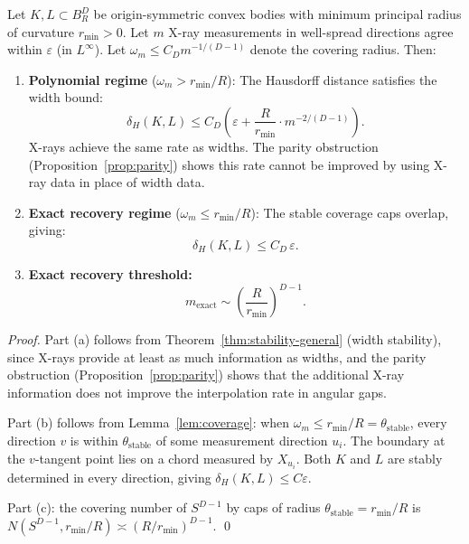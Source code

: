 \begin{theorem}
\label{thm:xray-revised}
Let $K, L \subset B_R^D$ be origin-symmetric convex bodies with minimum principal radius of curvature $r_{\min} > 0$. Let $m$ X-ray measurements in well-spread directions agree within $\varepsilon$ (in $L^\infty$). Let $\omega_m \leq C_D m^{-1/(D-1)}$ denote the covering radius. Then:

\begin{enumerate}[label=(\alph*)]
  \item \textbf{Polynomial regime} ($\omega_m > r_{\min}/R$): The Hausdorff distance satisfies the width bound:
  \[
    \delta_H(K, L) \leq C_D\!\left(\varepsilon + \frac{R}{r_{\min}} \cdot m^{-2/(D-1)}\right).
  \]
  X-rays achieve the same rate as widths. The parity obstruction (Proposition~\ref{prop:parity}) shows this rate cannot be improved by using X-ray data in place of width data.

  \item \textbf{Exact recovery regime} ($\omega_m \leq r_{\min}/R$): The stable coverage caps overlap, giving:
  \[
    \delta_H(K, L) \leq C_D \, \varepsilon.
  \]

  \item \textbf{Exact recovery threshold:}
  \[
    m_{\mathrm{exact}} \sim \left(\frac{R}{r_{\min}}\right)^{D-1}.
  \]
\end{enumerate}
\end{theorem}

\begin{proof}
Part (a) follows from Theorem~\ref{thm:stability-general} (width stability), since X-rays provide at least as much information as widths, and the parity obstruction (Proposition~\ref{prop:parity}) shows that the additional X-ray information does not improve the interpolation rate in angular gaps.

Part (b) follows from Lemma~\ref{lem:coverage}: when $\omega_m \leq r_{\min}/R = \theta_{\mathrm{stable}}$, every direction $v$ is within $\theta_{\mathrm{stable}}$ of some measurement direction $u_i$. The boundary at the $v$-tangent point lies on a chord measured by $X_{u_i}$. Both $K$ and $L$ are stably determined in every direction, giving $\delta_H(K, L) \leq C\varepsilon$.

Part (c): the covering number of $S^{D-1}$ by caps of radius $\theta_{\mathrm{stable}} = r_{\min}/R$ is $N(S^{D-1}, r_{\min}/R) \asymp (R/r_{\min})^{D-1}$. \qed
\end{proof}


